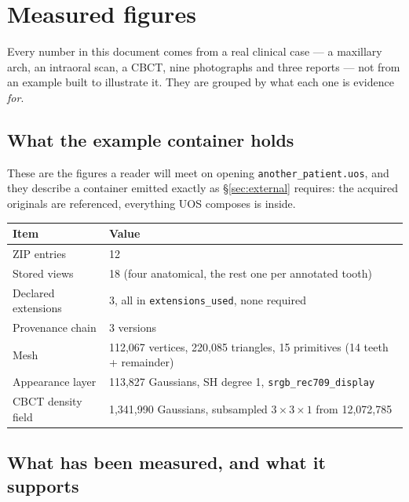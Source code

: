 \documentclass[11pt,a4paper]{article}
\newcommand{\code}[1]{\texttt{\small #1}}
\begin{document}
\section{Measured figures}\label{app:figures}

Every number in this document comes from a real clinical case --- a maxillary arch, an
intraoral scan, a CBCT, nine photographs and three reports --- not from an example built
to illustrate it. They are grouped by what each one is evidence \emph{for}.

\subsection*{What the example container holds}

These are the figures a reader will meet on opening \code{another\_patient.uos}, and they
describe a container emitted exactly as \S\ref{sec:external} requires: the acquired
originals are referenced, everything UOS composes is inside.

\begin{longtable}{L{6.2cm} L{9.2cm}}
\toprule
\textbf{Item} & \textbf{Value}\\
\midrule
\endhead
ZIP entries & 12\\
Stored views & 18 (four anatomical, the rest one per annotated tooth)\\
Declared extensions & 3, all in \code{extensions\_used}, none required\\
Provenance chain & 3 versions\\
Mesh & 112{,}067 vertices, 220{,}085 triangles, 15 primitives (14 teeth + remainder)\\
Appearance layer & 113{,}827 Gaussians, SH degree 1, \code{srgb\_rec709\_display}\\
CBCT density field & 1{,}341{,}990 Gaussians, subsampled $3\times3\times1$ from
12{,}072{,}785\\
\bottomrule
\end{longtable}

\subsection*{What has been measured, and what it supports}
\end{document}
